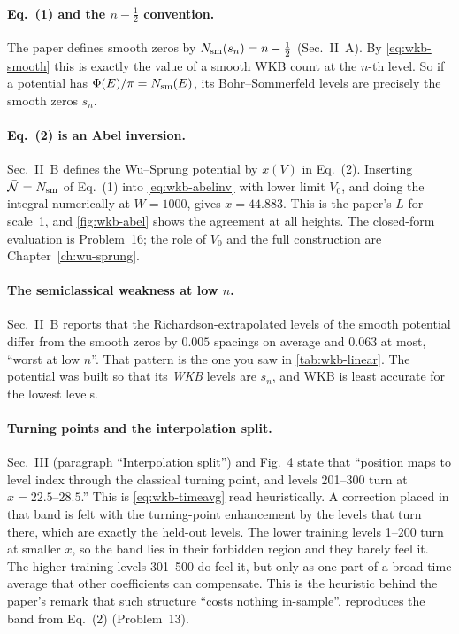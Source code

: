 \paragraph{Eq.~(1) and the $n-\frac12$ convention.} The paper defines smooth zeros by $N_{\mathrm{sm}}(s_n)=n-\frac12$ (Sec.~II~A). By \cref{eq:wkb-smooth} this is exactly the value of a smooth WKB count at the $n$-th level. So if a potential has $\Phi(E)/\pi=N_{\mathrm{sm}}(E)$, its Bohr--Sommerfeld levels are precisely the smooth zeros $s_n$.

\paragraph{Eq.~(2) is an Abel inversion.} Sec.~II~B defines the Wu--Sprung potential by $x(V)$ in Eq.~(2). Inserting $\bar{\mathcal N}=N_{\mathrm{sm}}$ of Eq.~(1) into \cref{eq:wkb-abelinv} with lower limit $V_0$, and doing the integral numerically at $W=1000$, gives $x=44.883$. This is the paper's $L$ for scale~1, and \cref{fig:wkb-abel} shows the agreement at all heights. The closed-form evaluation is Problem~16; the role of $V_0$ and the full construction are Chapter~\ref{ch:wu-sprung}.

\paragraph{The semiclassical weakness at low $n$.} Sec.~II~B reports that the Richardson-extrapolated levels of the smooth potential differ from the smooth zeros by $0.005$ spacings on average and $0.063$ at most, ``worst at low $n$''. That pattern is the one you saw in \cref{tab:wkb-linear}. The potential was built so that its \emph{WKB} levels are $s_n$, and WKB is least accurate for the lowest levels.

\paragraph{Turning points and the interpolation split.} Sec.~III (paragraph ``Interpolation split'') and Fig.~4 state that ``position maps to level index through the classical turning point, and levels 201--300 turn at $x=22.5$--$28.5$.'' This is \cref{eq:wkb-timeavg} read heuristically. A correction placed in that band is felt with the turning-point enhancement by the levels that turn there, which are exactly the held-out levels. The lower training levels 1--200 turn at smaller $x$, so the band lies in their forbidden region and they barely feel it. The higher training levels 301--500 do feel it, but only as one part of a broad time average that other coefficients can compensate. This is the heuristic behind the paper's remark that such structure ``costs nothing in-sample''.  reproduces the band from Eq.~(2) (Problem~13).

